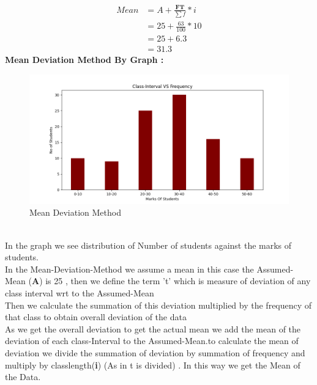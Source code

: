 \documentclass[journal,12pt,twocolumn]{IEEEtran}
\begin{document}
\begin{align*}
Mean & = A + \frac{ \textbf{FT} }{\sum f} * i\\
     & = 25 + \frac{63}{100} * 10\\
     & = 25 + 6.3\\
     & = 31.3
\end{align*}
\textbf{Mean Deviation Method By Graph :}
\begin{figure}[h]
\centering
\includegraphics[width=\columnwidth]{Assig-1-figure.png}
\caption{Mean Deviation Method}
\label{Fig1}
\end{figure}\\
In the graph we see distribution of Number of students against the marks of students.\\In the Mean-Deviation-Method we assume a mean in this case the Assumed-Mean (\textbf{A}) is 25 , then we define the term 't' which is measure of deviation of any class interval wrt to the Assumed-Mean \\Then we calculate the summation of this deviation multiplied by the frequency of that class to obtain overall deviation of the data \\As we get the overall deviation to get the actual mean we add the mean of the deviation of each class-Interval to the Assumed-Mean.to calculate the mean of deviation we divide the summation of deviation by summation of frequency and multiply by classlength(\textbf{i}) (As in t is divided) . In this way we get the Mean of the Data.
\end{document}
